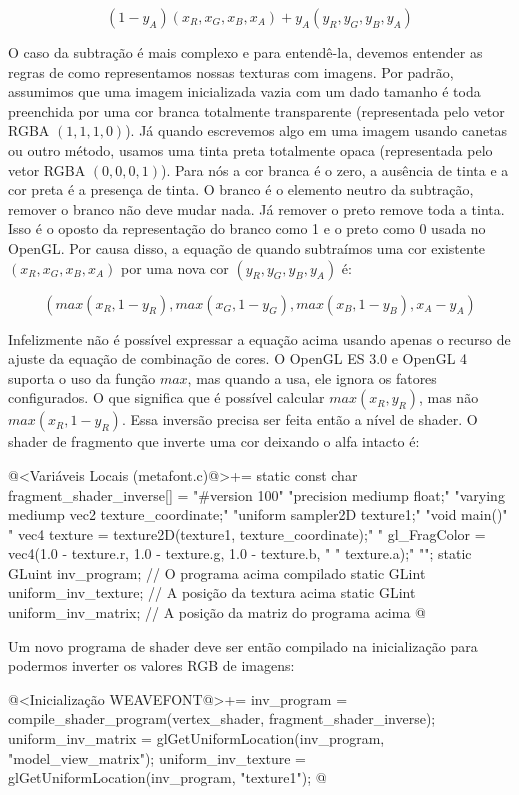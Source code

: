 {{{{{{$$(1-y_A)(x_R, x_G, x_B, x_A) + y_A(y_R, y_G, y_B, y_A)$$

O caso da subtração é mais complexo e para entendê-la, devemos
entender as regras de como representamos nossas texturas com
imagens. Por padrão, assumimos que uma imagem inicializada vazia com
um dado tamanho é toda preenchida por uma cor branca totalmente
transparente (representada pelo vetor RGBA $(1, 1, 1, 0)$). Já quando
escrevemos algo em uma imagem usando canetas ou outro método, usamos
uma tinta preta totalmente opaca (representada pelo vetor RGBA $(0, 0,
0, 1)$). Para nós a cor branca é o zero, a ausência de tinta e a cor
preta é a presença de tinta. O branco é o elemento neutro da
subtração, remover o branco não deve mudar nada. Já remover o preto
remove toda a tinta. Isso é o oposto da representação do branco como 1
e o preto como 0 usada no OpenGL. Por causa disso, a equação de quando
subtraímos uma cor existente $(x_R, x_G, x_B, x_A)$ por uma nova cor
$(y_R, y_G, y_B, y_A)$ é:

$$
(max(x_R, 1-y_R), max(x_G, 1-y_G), max(x_B, 1-y_B), x_A-y_A)
$$

Infelizmente não é possível expressar a equação acima usando apenas o
recurso de ajuste da equação de combinação de cores. O OpenGL ES 3.0 e
OpenGL 4 suporta o uso da função $max$, mas quando a usa, ele ignora
os fatores configurados. O que significa que é possível calcular
$max(x_R, y_R)$, mas não $max(x_R, 1- y_R)$. Essa inversão precisa ser
feita então a nível de shader. O shader de fragmento que inverte uma
cor deixando o alfa intacto é:

\iniciocodigo
@<Variáveis Locais (metafont.c)@>+=
static const char fragment_shader_inverse[] =
  "#version 100\n"
  "precision mediump float;\n"
  "varying mediump vec2 texture_coordinate;\n"
  "uniform sampler2D texture1;\n"
  "void main(){\n"
  "  vec4 texture = texture2D(texture1, texture_coordinate);\n"
  "  gl_FragColor = vec4(1.0 - texture.r, 1.0 - texture.g, 1.0 - texture.b, \n"
  "                      texture.a);\n"
  "}\n";
static GLuint inv_program; // O programa acima compilado
static GLint uniform_inv_texture; // A posição da textura acima
static GLint uniform_inv_matrix; // A posição da matriz do programa acima
@
\fimcodigo

Um novo programa de shader deve ser então compilado na inicialização
para podermos inverter os valores RGB de imagens:

\iniciocodigo
@<Inicialização WEAVEFONT@>+=
{
  inv_program = compile_shader_program(vertex_shader, fragment_shader_inverse);
  uniform_inv_matrix = glGetUniformLocation(inv_program, "model_view_matrix");
  uniform_inv_texture = glGetUniformLocation(inv_program, "texture1");
}
@
\fimcodigo

}}}}}}

